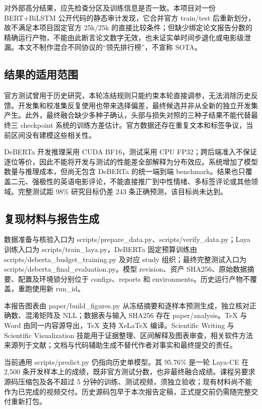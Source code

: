 \documentclass[UTF8,fontset=fandol,a4paper,11pt]{ctexart}
\begin{document}
对外部高分结果，应先检查分区及训练信息是否一致。本项目对一份 BERT+BiLSTM 公开代码的静态审计发现，它合并官方 train/test 后重新划分，故不满足本项目固定官方 25k/25k 的直接比较条件；但缺少绑定论文报告分数的精确运行产物，不能由此断言论文数字无效，也未证实单时间步退化或电影级泄漏。本文不制作混合不同协议的“领先排行榜”，不宣称 SOTA。

\subsection{结果的适用范围}
官方测试曾用于历史研究，本轮冻结规则只能约束本轮直接调参，无法消除历史反馈。开发集和校准集反复使用也带来选择偏差，最终候选并非从全新的独立开发集产生。此外，最终融合缺少多种子确认，头部与损失对照的三种子结果不能代替最终三 checkpoint 系统的训练方差估计。官方数据还存在重复文本和标签争议，当前区间没有建模这些相关性。

DeBERTa 开发推理采用 CUDA BF16，测试采用 CPU FP32；跨后端准入不保证逐位等价，因此不能将开发与测试的性能差全部解释为分布效应。系统增加了模型数量与推理成本，但尚无包含 DeBERTa 的统一端到端 benchmark。结果也只覆盖二元、强极性的英语电影评论，不能直接推广到中性情绪、多标签评论或其他领域。完整测试距 98\% 研究目标仍差 243 条正确预测，该目标尚未达到。

\subsection{复现材料与报告生成}
数据准备与核验入口为 scripts/prepare\_data.py、scripts/verify\_data.py；Laya 训练入口为 scripts/train\_laya.py，DeBERTa 固定预算训练由 scripts/deberta\_budget\_training.py 及对应 study 组织；最终完整测试入口为 scripts/deberta\_final\_evaluation.py。模型 revision、资产 SHA256、原始数据摘要、配置及环境锁分别位于 configs、reports 和 environments。历史运行产物不覆盖，重跑使用新 run\_id。

本报告图表由 paper/build\_figures.py 从冻结摘要和逐样本预测生成，独立核对正确数、混淆矩阵及 NLL；数据表与输入 SHA256 存在 paper/analysis。TeX 与 Word 由同一内容源导出，TeX 支持 XeLaTeX 编译。Scientific Writing 与 Scientific Visualization 技能用于证据整理、区间解释及图表审查，相关软件方法来源列于文献\cite{skills}；文档与代码辅助生成不替代作者对事实和最终提交的责任。

当前通用 scripts/predict.py 仍指向历史单模型。其 95.76\% 是一轮 Laya-CE 在 2,500 条开发样本上的成绩，既非官方测试分数，也非最终融合成绩。课程另要求源码压缩包及各不超过 5 分钟的训练、测试视频，须独立验收；现有材料尚不能作为已完成的视频交付。历史源码包早于本次报告定稿，正式提交前仍需随完整交付重新打包。
\end{document}

